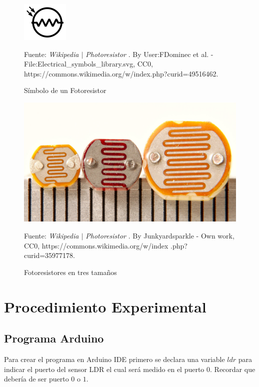 \documentclass{article}
\begin{document}
\begin{figure}[H]
\centering
\includegraphics[width=0.2\paperwidth]{images/ldr-symbol}
\caption{Símbolo de un Fotoresistor}\footnotesize
Fuente: \textit{Wikipedia $\mid$ Photoresistor} \cite{wikipedia-ldr-2022}. By
User:FDominec et al. - File:Electrical\_symbols\_library.svg, CC0,
https://commons.wikimedia.org/w/index.php?curid=49516462.
\end{figure}

\begin{figure}[H]
\centering
\includegraphics[width=0.2\paperwidth]{images/ldr-three-sizes.jpg}
\caption{Fotoresistores en tres tamaños}\footnotesize
Fuente: \textit{Wikipedia $\mid$ Photoresistor} \cite{wikipedia-ldr-2022}. By
Junkyardsparkle - Own work, CC0, https://commons.wikimedia.org/w/index
.php?curid=35977178.
\end{figure}

\section{Procedimiento Experimental}

\subsection{Programa Arduino}

Para crear el programa en Arduino IDE primero se declara una variable $ldr$
para indicar el puerto del sensor LDR el cual será medido en el puerto $0$.
Recordar que debería de ser puerto $0$ o $1$.

\bigbreak
\end{document}
